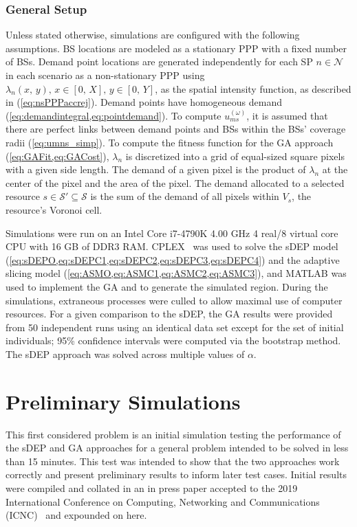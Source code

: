 \documentclass[12pt,dvipsnames]{report}
\begin{document}
\subsubsection{General Setup}

Unless stated otherwise, simulations are configured with the following assumptions.  BS locations are modeled as a stationary PPP with a fixed number of BSs.  Demand point locations are generated independently for each SP $n \in \mathcal{N}$ in each scenario as a non-stationary PPP using $\lambda_n\left( x,\, y \right),\, x \in \left[ 0,\, X \right],\, y \in \left[ 0,\, Y \right]$, as the spatial intensity function, as described in  (\cref{eq:nsPPPaccrej}).  Demand points have homogeneous demand (\cref{eq:demandintegral,eq:pointdemand}).  To compute $u_{ms}^{\left( \omega \right)}$, it is assumed that there are perfect links between demand points and BSs within the BSs' coverage radii (\cref{eq:umns_simp}).  To compute the fitness function for the GA approach (\cref{eq:GAFit,eq:GACost}), $\lambda_n$ is discretized into a grid of equal-sized square pixels with a given side length.  The demand of a given pixel is the product of $\lambda_n$ at the center of the pixel and the area of the pixel.  The demand allocated to a selected resource $s \in \mathcal{S}' \subseteq \mathcal{S}$ is the sum of the demand of all pixels within $V_s$, the resource's Voronoi cell.

Simulations were run on an Intel Core i7-4790K 4.00 GHz 4 real/8 virtual core CPU with 16 GB of DDR3 RAM.  CPLEX~\cite{Cplex} was used to solve the sDEP model (\cref{eq:sDEPO,eq:sDEPC1,eq:sDEPC2,eq:sDEPC3,eq:sDEPC4}) and the adaptive slicing model (\cref{eq:ASMO,eq:ASMC1,eq:ASMC2,eq:ASMC3}), and MATLAB was used to implement the GA and to generate the simulated region.  During the simulations, extraneous processes were culled to allow maximal use of computer resources.  For a given comparison to the sDEP, the GA results were provided from 50 independent runs using an identical data set except for the set of initial individuals; 95\% confidence intervals were computed via the bootstrap method.  The sDEP approach was solved across multiple values of $\alpha$.

\section{Preliminary Simulations} \label{sec:prelim}

This first considered problem is an initial simulation testing the performance of the sDEP and GA approaches for a general problem intended to be solved in less than 15 minutes.  This test was intended to show that the two approaches work correctly and present preliminary results to inform later test cases.  Initial results were compiled and collated in an in press paper accepted to the 2019 International Conference on Computing, Networking and Communications (ICNC)~\cite{KTeague:BSSelection} and expounded on here.
\end{document}
